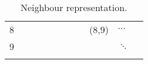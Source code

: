 \begin{table}[!htb]
\begin{tabular}{lllllllllll}
			8 &                               &                               &                               &                               &                               &                               &                               & \cellcolor[HTML]{C0C0C0}(8,9) & \cellcolor[HTML]{C0C0C0}$\cdots$ &  \\
			9 &                               &                               &                               &                               &                               &                               &                               &                               & $\ddots$                         &  \\
			&                               &                               &                               &                               &                               &                               &                               &                               &                                  & 
		\end{tabular}
		\caption{Neighbour representation.}
	\end{table}